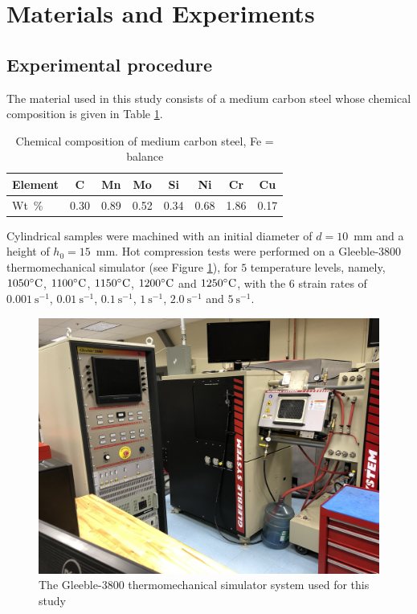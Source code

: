 \documentclass[twoside,english,1p,final,sort&compress]{elsarticle}
\theoremstyle{plain}
\DeclareRobustCommand{\ps}{\text{s}^{-1}}
\begin{document}
\section{Materials and Experiments\label{sec:Materials}}

\subsection{Experimental procedure}

The material used in this study consists of a medium carbon steel whose chemical composition is given in Table \ref{tab:Composition}.
\begin{table}[h!]
\centering
\caption{Chemical composition of medium carbon steel, Fe = balance}
\begin{tabular}{lccccccc}
	\hline
	Element &  C   &  Mn  &  Mo  &  Si  &  Ni  &  Cr  &  Cu  \\ \hline
	Wt~\%   & 0.30 & 0.89 & 0.52 & 0.34 & 0.68 & 1.86 & 0.17 \\ \hline
\end{tabular}
\label{tab:Composition}
\end{table}
Cylindrical samples were machined with an initial diameter of $d=10$~mm and a height of $h_0=15$~mm.
Hot compression tests were performed on a Gleeble-3800 thermomechanical simulator (see Figure \ref{fig:Gleeble3800}), for $5$ temperature levels, namely, $1050\celsius$, $1100\celsius$, $1150\celsius$, $1200\celsius$ and $1250\celsius$, with the $6$ strain rates of $0.001~\ps$, $0.01~\ps$, $0.1~\ps$, $1~\ps$, $2.0~\ps$ and $5~\ps$.
\begin{figure}[!ht]
\centering
\includegraphics[width=0.7\columnwidth]{Figures/Gleeble-3800}
\caption{The Gleeble-3800 thermomechanical simulator system used for this study}
\label{fig:Gleeble3800}
\end{figure}
\end{document}
